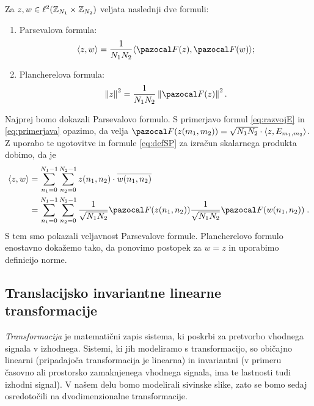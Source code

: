 %
\begin{izrek}
Za $z, w \in \ell^2(\mathbb Z_{N_1} \times \mathbb Z_{N_2})$ veljata naslednji dve formuli:
\begin{enumerate}
\item Parsevalova formula:
$$\langle z, w \rangle = \frac{1}{N_1 N_2} \langle \F(z), \F(w) \rangle;$$
\item Plancherelova formula:
$$\norm{z}^2 = \frac{1}{N_1 N_2} \norm{\F(z)}^2.$$
\end{enumerate}
\end{izrek}
%
\begin{dokaz} Najprej bomo dokazali Parsevalovo formulo. S primerjavo formul \eqref{eq:razvojE} in \eqref{eq:primerjava} opazimo, da velja $\F(z(m_1, m_2)) = \sqrt{N_1N_2} \cdot \langle z, E_{m_1, m_2}\rangle$. Z uporabo te ugotovitve in formule \eqref{eq:defSP} za izračun skalarnega produkta dobimo, da je
%
\begin{align*}
\langle z, w \rangle & = \sum_{n_1 = 0}^{N_1 - 1} \sum_{n_2 = 0}^{N_2 - 1} z(n_1, n_2) \cdot \overline{w(n_1, n_2)} \\
& = \sum_{n_1 = 0}^{N_1 - 1} \sum_{n_2 = 0}^{N_2 - 1} \frac{1}{\sqrt{N_1N_2}} \F(z(n_1, n_2)) \frac{1}{\sqrt{N_1N_2}} \F(w(n_1,n_2)) \;.
\end{align*}
% 
S tem smo pokazali veljavnost Parsevalove formule. Plancherelovo formulo enostavno dokažemo tako, da ponovimo postopek za $w = z$ in uporabimo definicijo norme.
\end{dokaz}
%
\subsection{Translacijsko invariantne linearne transformacije}
\emph{Transformacija} je matematični zapis sistema, ki poskrbi za pretvorbo vhodnega signala v izhodnega. Sistemi, ki jih modeliramo s transformacijo, so običajno linearni (pripadajoča transformacija je linearna) in invariantni (v primeru časovno ali prostorsko zamaknjenega vhodnega signala, ima te lastnosti tudi izhodni signal). V našem delu bomo modelirali sivinske slike, zato se bomo sedaj osredotočili na dvodimenzionalne transformacije.
 
